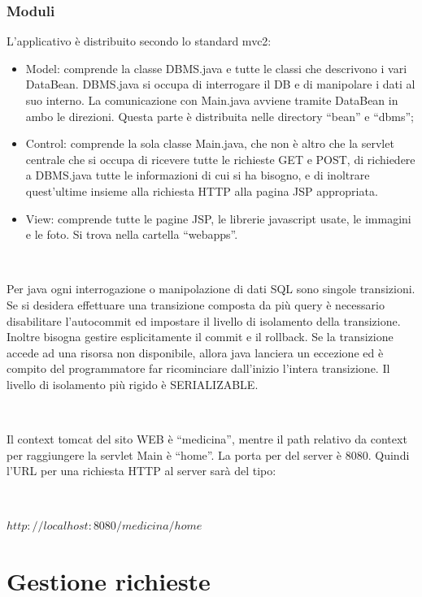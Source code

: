 \documentclass[a4paper,titlepage]{article}
\begin{document}
\section{Moduli}
L'applicativo è distribuito secondo lo standard mvc2:

\begin{itemize}[leftmargin=0.5cm, topsep=0.25cm, itemsep=0.2cm]
\item Model: comprende la classe DBMS.java e tutte le classi che descrivono i vari DataBean. DBMS.java si occupa di interrogare il DB e di manipolare i dati al suo interno. La comunicazione con Main.java avviene tramite DataBean in ambo le direzioni. Questa parte è distribuita nelle directory ``bean'' e ``dbms'';
\item Control: comprende la sola classe Main.java, che non è altro che la servlet centrale che si occupa di ricevere tutte le richieste GET e POST, di richiedere a 
DBMS.java tutte le informazioni di cui si ha bisogno, e di inoltrare quest'ultime insieme alla richiesta HTTP alla pagina JSP appropriata.
\item View: comprende tutte le pagine JSP, le librerie javascript usate, le immagini e le foto. Si trova nella cartella ``webapps''.

\end{itemize}

~

Per java ogni interrogazione o manipolazione di dati SQL sono singole transizioni. Se si desidera effettuare una transizione composta da più query è necessario disabilitare l'autocommit ed impostare il livello di isolamento della transizione. Inoltre bisogna gestire esplicitamente il commit e il rollback. Se la transizione accede ad una risorsa non disponibile, allora java lanciera un eccezione ed è compito del programmatore far ricominciare dall'inizio l'intera transizione. Il livello di isolamento più rigido è SERIALIZABLE.

~

Il context tomcat del sito WEB è ``medicina'', mentre il path relativo da context per raggiungere la 
servlet Main è ``home''. La porta per del server è 8080. Quindi l'URL per una richiesta HTTP al 
server sarà del tipo:

~

$http://localhost:8080/medicina/home$

\part{Gestione richieste}
\end{document}
